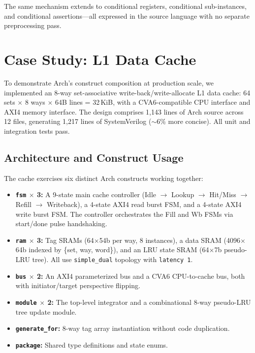 \documentclass[manuscript]{acmart}
\begin{document}
The same mechanism extends to conditional registers, conditional sub-instances, and conditional assertions---all expressed in the source language with no separate preprocessing pass.

\section{Case Study: L1 Data Cache}\label{sec:example}

To demonstrate Arch's construct composition at production scale, we implemented an 8-way set-associative write-back/write-allocate L1 data cache: 64 sets $\times$ 8 ways $\times$ 64B lines = 32\,KiB, with a CVA6-compatible CPU interface and AXI4 memory interface. The design comprises 1,143 lines of Arch source across 12 files, generating 1,217 lines of SystemVerilog (${\sim}$6\% more concise). All unit and integration tests pass.

\subsection{Architecture and Construct Usage}

The cache exercises six distinct Arch constructs working together:

\begin{itemize}
\item \textbf{\texttt{fsm} $\times$ 3:} A 9-state main cache controller (Idle $\to$ Lookup $\to$ Hit/Miss $\to$ Refill $\to$ Writeback), a 4-state AXI4 read burst FSM, and a 4-state AXI4 write burst FSM. The controller orchestrates the Fill and Wb FSMs via start/done pulse handshaking.
\item \textbf{\texttt{ram} $\times$ 3:} Tag SRAMs (64$\times$54b per way, 8 instances), a data SRAM (4096$\times$64b indexed by \{set, way, word\}), and an LRU state SRAM (64$\times$7b pseudo-LRU tree). All use \texttt{simple\_dual} topology with \texttt{latency 1}.
\item \textbf{\texttt{bus} $\times$ 2:} An AXI4 parameterized bus and a CVA6 CPU-to-cache bus, both with initiator/target perspective flipping.
\item \textbf{\texttt{module} $\times$ 2:} The top-level integrator and a combinational 8-way pseudo-LRU tree update module.
\item \textbf{\texttt{generate\_for}:} 8-way tag array instantiation without code duplication.
\item \textbf{\texttt{package}:} Shared type definitions and state enums.
\end{itemize}
\end{document}
